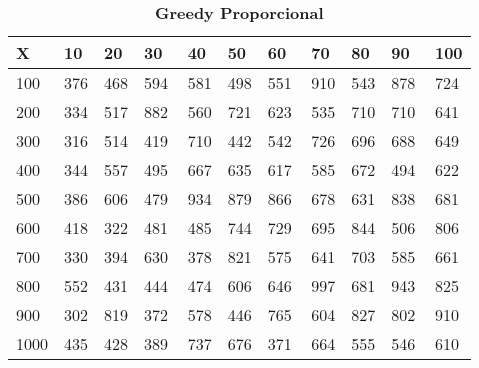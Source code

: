 \documentclass[10pt,letterpaper]{article}
\begin{document}
\begin{center}
\begin{table}\renewcommand{\arraystretch}{2.5}
\caption{\large \textbf{Greedy Proporcional}}
\centering
\begin{tabular} { |m{0.5cm}|m{1.3cm}|m{1.3cm}|m{1.3cm}|m{1.3cm}|m{1.3cm}|m{1.3cm}|m{1.3cm}|m{1.3cm}|m{1.3cm}|m{1.3cm}|} 
\hline
\rowcolor{Gray}
\centering \textbf{X} & \centering \textbf{10} & \centering \textbf{20} & \centering \textbf{30}\ & \centering \textbf{40} & \centering \textbf{50} & \centering \textbf{60}\ & \centering \textbf{70} & \centering \textbf{80} & \centering \textbf{90}\ & \textbf{100} \\\hline
\cellcolor{Gray}100 & \Large 376 & \Large 468 & \Large 594 & \Large 581 & \Large 498 & \Large 551 & \Large 910 & \Large 543 & \Large 878 & \Large 724 \\
\hline
\cellcolor{Gray}200 & \Large 334 & \Large 517 & \Large 882 & \Large 560 & \Large 721 & \Large 623 & \Large 535 & \Large 710 & \Large 710 & \Large 641 \\
\hline
\cellcolor{Gray}300 & \Large 316 & \Large 514 & \Large 419 & \Large 710 & \Large 442 & \Large 542 & \Large 726 & \Large 696 & \Large 688 & \Large 649 \\
\hline
\cellcolor{Gray}400 & \Large 344 & \Large 557 & \Large 495 & \Large 667 & \Large 635 & \Large 617 & \Large 585 & \Large 672 & \Large 494 & \Large 622 \\
\hline
\cellcolor{Gray}500 & \Large 386 & \Large 606 & \Large 479 & \Large 934 & \Large 879 & \Large 866 & \Large 678 & \Large 631 & \Large 838 & \Large 681 \\
\hline
\cellcolor{Gray}600 & \Large 418 & \Large 322 & \Large 481 & \Large 485 & \Large 744 & \Large 729 & \Large 695 & \Large 844 & \Large 506 & \Large 806 \\
\hline
\cellcolor{Gray}700 & \Large 330 & \Large 394 & \Large 630 & \Large 378 & \Large 821 & \Large 575 & \Large 641 & \Large 703 & \Large 585 & \Large 661 \\
\hline
\cellcolor{Gray}800 & \Large 552 & \Large 431 & \Large 444 & \Large 474 & \Large 606 & \Large 646 & \Large 997 & \Large 681 & \Large 943 & \Large 825 \\
\hline
\cellcolor{Gray}900 & \Large 302 & \Large 819 & \Large 372 & \Large 578 & \Large 446 & \Large 765 & \Large 604 & \Large 827 & \Large 802 & \Large 910 \\
\hline
\cellcolor{Gray}1000 & \Large 435 & \Large 428 & \Large 389 & \Large 737 & \Large 676 & \Large 371 & \Large 664 & \Large 555 & \Large 546 & \Large 610 \\
\hline
\end{tabular} \\
\end{table}
\end{center}
\end{document}

